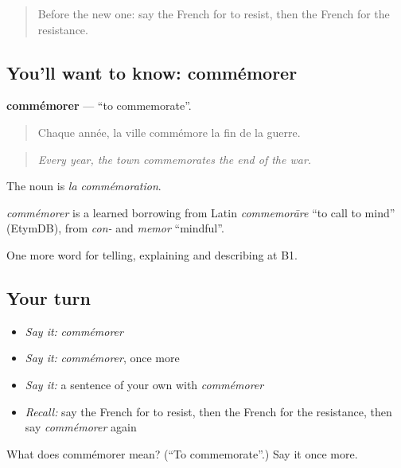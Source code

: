 \label{lesson:FR-C326-commemorer}



\begin{quote}
Before the new one: say the French for to resist, then the French for the resistance.
\end{quote}

\subsection*{You'll want to know: commémorer}
\textbf{commémorer} — \textquotedblleft{}to commemorate\textquotedblright{}.

\begin{quote}
Chaque année, la ville commémore la fin de la guerre.
\end{quote}

\begin{quote}
\emph{Every year, the town commemorates the end of the war.}
\end{quote}

The noun is \emph{la commémoration}.

\begin{cousinweb}
\emph{commémorer} is a learned borrowing from Latin \emph{commemorāre} \textquotedblleft{}to call to mind\textquotedblright{} (EtymDB), from \emph{con-} and \emph{memor} \textquotedblleft{}mindful\textquotedblright{}.
\end{cousinweb}

\begin{grammarlens}[title={What you've built}]
One more word for telling, explaining and describing at B1.
\end{grammarlens}

\subsection*{Your turn}
\begin{itemize}
\raggedright
  \item \emph{Say it:} \emph{commémorer}
  \item \emph{Say it:} \emph{commémorer}, once more
  \item \emph{Say it:} a sentence of your own with \emph{commémorer}
  \item \emph{Recall:} say the French for to resist, then the French for the resistance, then say \emph{commémorer} again
\end{itemize}

\begin{tcolorbox}[breakable,colback=teal!4,colframe=teal!35!black,title={Before you move on}]
What does commémorer mean? (\textquotedblleft{}To commemorate\textquotedblright{}.) Say it once more.
\end{tcolorbox}
